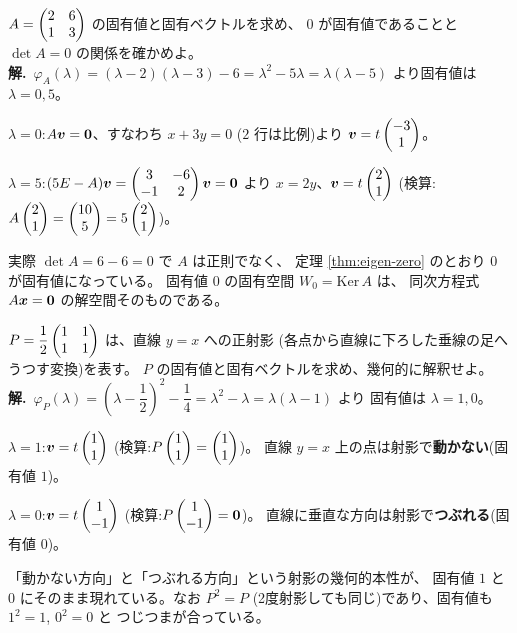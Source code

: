 \begin{rei}\label{rei:eigen-zero-ex}
$A = \begin{pmatrix}2 & 6 \\ 1 & 3\end{pmatrix}$ の固有値と固有ベクトルを求め、
$0$ が固有値であることと $\det A = 0$ の関係を確かめよ。\\
\textbf{解.}\ $\varphi_A(\lambda) = (\lambda - 2)(\lambda - 3) - 6
= \lambda^2 - 5\lambda = \lambda(\lambda - 5)$ より固有値は
$\lambda = 0, 5$。

$\lambda = 0$:$A\bm{v} = \bm{0}$、すなわち $x + 3y = 0$
($2$ 行は比例)より $\bm{v} = t\begin{pmatrix}-3 \\ 1\end{pmatrix}$。

$\lambda = 5$:$(5E - A)\bm{v} = \begin{pmatrix}3 & -6 \\ -1 & 2\end{pmatrix}\bm{v} = \bm{0}$
より $x = 2y$、$\bm{v} = t\begin{pmatrix}2 \\ 1\end{pmatrix}$
(検算:$A\begin{pmatrix}2 \\ 1\end{pmatrix} = \begin{pmatrix}10 \\ 5\end{pmatrix} = 5\begin{pmatrix}2 \\ 1\end{pmatrix}$)。

実際 $\det A = 6 - 6 = 0$ で $A$ は正則でなく、
定理 \ref{thm:eigen-zero} のとおり $0$ が固有値になっている。
固有値 $0$ の固有空間 $W_0 = \mathrm{Ker}\,A$ は、
同次方程式 $A\bm{x} = \bm{0}$ の解空間そのものである。
\end{rei}

\begin{rei}[例題・標準(証明:射影の固有値)]\label{rei:eigen-proj}
$P = \dfrac{1}{2}\begin{pmatrix}1 & 1 \\ 1 & 1\end{pmatrix}$ は、直線 $y = x$ への正射影
(各点から直線に下ろした垂線の足へうつす変換)を表す。
$P$ の固有値と固有ベクトルを求め、幾何的に解釈せよ。\\
\textbf{解.}\ $\varphi_P(\lambda) = \left(\lambda - \dfrac{1}{2}\right)^2
- \dfrac{1}{4} = \lambda^2 - \lambda = \lambda(\lambda - 1)$ より
固有値は $\lambda = 1, 0$。

$\lambda = 1$:$\bm{v} = t\begin{pmatrix}1 \\ 1\end{pmatrix}$
(検算:$P\begin{pmatrix}1 \\ 1\end{pmatrix} = \begin{pmatrix}1 \\ 1\end{pmatrix}$)。
直線 $y = x$ 上の点は射影で\textbf{動かない}(固有値 $1$)。

$\lambda = 0$:$\bm{v} = t\begin{pmatrix}1 \\ -1\end{pmatrix}$
(検算:$P\begin{pmatrix}1 \\ -1\end{pmatrix} = \bm{0}$)。
直線に垂直な方向は射影で\textbf{つぶれる}(固有値 $0$)。

「動かない方向」と「つぶれる方向」という射影の幾何的本性が、
固有値 $1$ と $0$ にそのまま現れている。なお $P^2 = P$
(2度射影しても同じ)であり、固有値も $1^2 = 1$, $0^2 = 0$ と
つじつまが合っている。
\end{rei}

